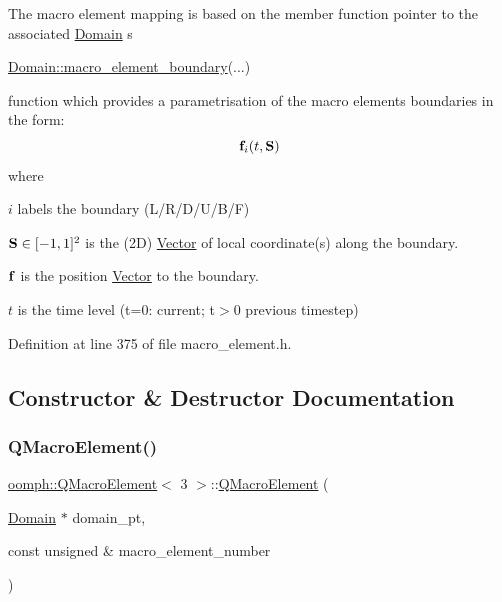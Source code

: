 The macro element mapping is based on the member function pointer to the associated \hyperlink{classoomph_1_1Domain}{Domain} \textquotesingle{}s 
\begin{DoxyCode}
\hyperlink{classoomph_1_1Domain_a95f3e00d28ea37e6c4d3027bfac91096}{Domain::macro\_element\_boundary}(...) 
\end{DoxyCode}
 function which provides a parametrisation of the macro element\textquotesingle{}s boundaries in the form\+: \[ {\bf f}_{i} (t,{\bf S}) \] where
\begin{DoxyItemize}
\item $ i $ labels the boundary (L/\+R/\+D/\+U/\+B/F)
\item $ {\bf S} \in [-1,1]^2 $ is the (2D) \hyperlink{classoomph_1_1Vector}{Vector} of local coordinate(s) along the boundary.
\item $ {\bf f} $ is the position \hyperlink{classoomph_1_1Vector}{Vector} to the boundary.
\item $ t $ is the time level (t=0\+: current; t$>$0 previous timestep) 
\end{DoxyItemize}

Definition at line 375 of file macro\+\_\+element.\+h.



\subsection{Constructor \& Destructor Documentation}
\mbox{\label{classoomph_1_1QMacroElement_3_013_01_4_a51599bea29101ab0473485b0815e4797}} 
\subsubsection{\texorpdfstring{Q\+Macro\+Element()}{QMacroElement()}\hspace{0.1cm}{\footnotesize\ttfamily [1/3]}}
{\footnotesize\ttfamily \hyperlink{classoomph_1_1QMacroElement}{oomph\+::\+Q\+Macro\+Element}$<$ 3 $>$\+::\hyperlink{classoomph_1_1QMacroElement}{Q\+Macro\+Element} (\begin{DoxyParamCaption}\item[{\hyperlink{classoomph_1_1Domain}{Domain} $\ast$}]{domain\+\_\+pt,  }\item[{const unsigned \&}]{macro\+\_\+element\+\_\+number }\end{DoxyParamCaption})\hspace{0.3cm}{\ttfamily [inline]}}



